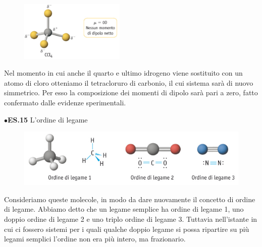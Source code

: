 \hspace{0.5cm}\begin{minipage}{0.2\textwidth}
\begin{figure}[H]
\includegraphics[width=5cm]{immagini/CCl_4.png}
\end{figure}
\end{minipage} \hfill
\begin{minipage}{0.5\textwidth}
Nel momento in cui anche il quarto e ultimo idrogeno viene sostituito con un atomo di cloro otteniamo il tetracloruro di carbonio, il cui sistema sarà di nuovo simmetrico. Per esso la composizione dei momenti di dipolo sarà pari a zero, fatto confermato dalle evidenze sperimentali.
\end{minipage}

\vspace{0.2cm}$\bullet$\textbf{ES.15} L'ordine di legame
\begin{figure}[htp]
    \centering
    \includegraphics[width=14cm]{immagini/ordine-di-legame.png}
\end{figure}

Consideriamo queste molecole, in modo da dare nuovamente il concetto di ordine di legame. Abbiamo detto che un legame semplice ha ordine di legame 1, uno doppio ordine di legame 2 e uno triplo ordine di legame 3. Tuttavia nell'istante in cui ci fossero sistemi per i quali qualche doppio legame si possa ripartire su più legami semplici l'ordine non era più intero, ma frazionario.


